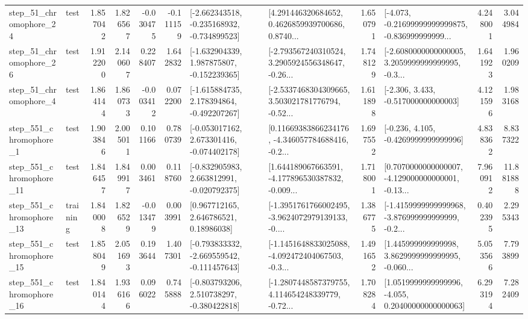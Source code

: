\begin{tabular}{llrrrrllrlrr}
   step\_51\_chromophore\_24 &      test &      1.857042 &    1.826567 &     -0.030475 & -0.111159 &  [-2.662343518, -0.235168932, -0.734899523] &  [4.291446320684652, 0.4626859939700686, 0.8740... &       1.650791 &  [-4.073, -0.21699999999999875, -0.836999999999... &            4.248001 &          3.044984 \\
   step\_51\_chromophore\_26 &      test &      1.912200 &    2.140607 &      0.228407 &  1.642832 &   [-1.632904339, 1.987875807, -0.152239365] &  [-2.793567240310524, 3.2905924556348647, -0.26... &       1.748129 &  [-2.6080000000000005, 3.2059999999999995, -0.3... &            1.641923 &          1.960209 \\
    step\_51\_chromophore\_4 &      test &      1.864144 &    1.860733 &     -0.003412 &  0.072200 &   [-1.615884735, 2.178394864, -0.492207267] &  [-2.5337468304309665, 3.503021781776794, -0.52... &       1.611898 &                [-2.306, 3.433, -0.517000000000003] &            4.121596 &          1.983168 \\
   step\_551\_chromophore\_1 &      test &      1.903846 &    2.005011 &      0.101166 &  0.780739 &   [-0.053017162, 2.673301416, -0.074402178] &  [0.11669383866234176, -4.346057784688416, -0.2... &       1.697552 &               [-0.236, 4.105, -0.4269999999999996] &            4.838362 &          8.837322 \\
  step\_551\_chromophore\_11 &      test &      1.846457 &    1.849917 &      0.003461 &  0.118760 &   [-0.832905983, 2.663812991, -0.020792375] &  [1.644189067663591, -4.177896530387832, -0.009... &       1.718001 &  [0.7070000000000007, -4.129000000000001, -0.13... &            7.960912 &         11.881888 \\
  step\_551\_chromophore\_13 &  training &      1.840008 &    1.826529 &     -0.013479 &  0.003991 &      [0.967712165, 2.646786521, 0.18986038] &  [-1.3951761766002495, -3.9624072979139133, -0.... &       1.386775 &  [-1.4159999999999968, -3.876999999999999, -0.2... &            0.402395 &          2.295343 \\
  step\_551\_chromophore\_15 &      test &      1.858049 &    2.051693 &      0.193644 &  1.407301 &  [-0.793833332, -2.669559542, -0.111457643] &  [-1.1451648833025088, -4.092472404067503, -0.3... &       1.491652 &  [1.445999999999998, 3.8629999999999995, -0.060... &            5.053566 &          7.793899 \\
  step\_551\_chromophore\_16 &      test &      1.840144 &    1.936166 &      0.096022 &  0.745888 &   [-0.803793206, 2.510738297, -0.380422818] &  [-1.2807448587379755, 4.114654248339779, -0.72... &       1.708284 &  [1.0519999999999996, -4.055, 0.20400000000000063] &            6.293194 &          7.282409 \\

\end{tabular}

